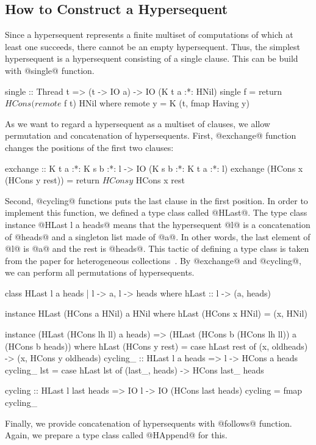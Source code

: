 \subsection{How to Construct a Hypersequent}
Since a hypersequent represents a finite multiset of computations of which
at least one succeeds, there cannot be an empty hypersequent.  Thus, the
simplest hypersequent is a hypersequent consisting of a single clause.
This can be build with @single@ function.
\begin{code}
single :: Thread t => (t -> IO a) -> IO (K t a :*: HNil)
single f = return $ HCons (remote $ f t) HNil
  where
    remote y = K (t, fmap Having y)
\end{code}

As we want to regard a hypersequent as a multiset of clauses, we allow
permutation and concatenation of hypersequents.
First, @exchange@ function changes the positions of the first two
clauses:
\begin{code}
exchange :: K t a :*: K s b :*: l ->
            IO (K s b :*: K t a :*: l)
exchange (HCons x (HCons y rest)) =
  return $ HCons y $ HCons x rest
\end{code}
Second, @cycling@ functions puts the last clause in the first position.
In order to implement this function, we defined a type class called
@HLast@.
The type class instance @HLast l a heads@ means that the hypersequent @l@
is a concatenation of @heads@ and a singleton list made of @a@.  In
other words, the last element of @l@ is @a@ and the rest is @heads@.
This tactic of defining a type class is taken from the paper for
heterogeneous collections~\citep{hetero}.
By @exchange@ and @cycling@, we can perform all permutations of
hypersequents.
\begin{code}
class HLast l a heads | l -> a, l -> heads
 where hLast :: l -> (a, heads)

instance HLast (HCons a HNil) a HNil
    where hLast (HCons x HNil) = (x, HNil)

instance (HLast (HCons lh ll) a heads) =>
  (HLast (HCons b (HCons lh ll)) a (HCons b heads))
    where hLast (HCons y rest) =
              case hLast rest of
                (x, oldheads) -> (x, HCons y oldheads)
cycling_ :: HLast l a heads => l -> HCons a heads
cycling_ lst = case hLast lst of
                (last_, heads) -> HCons last_ heads

cycling :: HLast l last heads =>
  IO l -> IO (HCons last heads)
cycling = fmap cycling_
\end{code}
Finally, we provide concatenation of hypersequents with @follows@
function.
Again, we prepare a type class called @HAppend@ for this.

